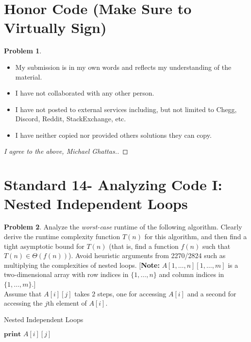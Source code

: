 \documentclass[11pt]{article}
\theoremstyle{definition}
\theoremstyle{definition}
\newtheorem{required}{Problem}
\theoremstyle{definition}
\begin{document}
\section{Honor Code (Make Sure to Virtually Sign)} \label{HonorCode}

\begin{required}
\noindent 
\begin{itemize}
\item My submission is in my own words and reflects my understanding of the material.
\item I have not collaborated with any other person.
\item I have not posted to external services including, but not limited to Chegg, Discord, Reddit, StackExchange, etc.
\item I have neither copied nor provided others solutions they can copy.
\end{itemize}

\end{required}

\begin{proof}[I agree to the above, Michael Ghattas.]
\end{proof}


\newpage
\section{Standard 14- Analyzing Code I: Nested Independent Loops}
\begin{required}
Analyze the \textit{worst-case} runtime of the following algorithm. Clearly derive the runtime complexity function $T(n)$ for this algorithm, and then find a tight asymptotic bound for $T(n)$ (that is, find a function $f(n)$ such that $T(n) \in \Theta(f(n))$). Avoid heuristic arguments from 2270/2824 such as multiplying the complexities of nested loops. [\textbf{Note:} $A[1, \ldots, n][1, \ldots, m]$ is a two-dimensional array with row indices in $\{1, \ldots, n\}$ and column indices in $\{1, \ldots, m\}$.] \\

\noindent Assume that $A[i][j]$ takes $2$ steps, one for accessing $A[i]$ and a second for accessing the $j$th element of $A[i]$.

\begin{algorithm}
\caption{Nested Independent Loops}\label{alg:NestedIndependent}
\begin{algorithmic}[1]
		\State $\textbf{print } A[i][j]$
	\EndFor
\EndFor
\EndProcedure
\end{algorithmic}
\end{algorithm}
\end{required}
\end{document}
